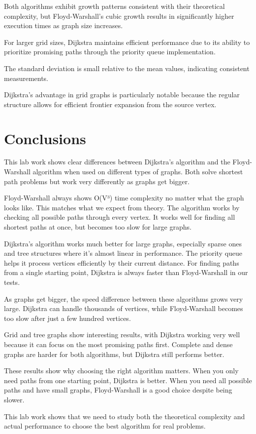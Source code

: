 \documentclass[a4paper,12pt]{article}
\begin{document}
Both algorithms exhibit growth patterns consistent with their theoretical complexity, but Floyd-Warshall's cubic growth results in significantly higher execution times as graph size increases.

For larger grid sizes, Dijkstra maintains efficient performance due to its ability to prioritize promising paths through the priority queue implementation.

The standard deviation is small relative to the mean values, indicating consistent measurements.

Dijkstra's advantage in grid graphs is particularly notable because the regular structure allows for efficient frontier expansion from the source vertex.
\section{Conclusions}
\label{sec:orge143ca6}

This lab work shows clear differences between Dijkstra's algorithm and the Floyd-Warshall algorithm when used on different types of graphs. Both solve shortest path problems but work very differently as graphs get bigger.

Floyd-Warshall always shows O(V³) time complexity no matter what the graph looks like. This matches what we expect from theory. The algorithm works by checking all possible paths through every vertex. It works well for finding all shortest paths at once, but becomes too slow for large graphs.

Dijkstra's algorithm works much better for large graphs, especially sparse ones and tree structures where it's almost linear in performance. The priority queue helps it process vertices efficiently by their current distance. For finding paths from a single starting point, Dijkstra is always faster than Floyd-Warshall in our tests.

As graphs get bigger, the speed difference between these algorithms grows very large. Dijkstra can handle thousands of vertices, while Floyd-Warshall becomes too slow after just a few hundred vertices.

Grid and tree graphs show interesting results, with Dijkstra working very well because it can focus on the most promising paths first. Complete and dense graphs are harder for both algorithms, but Dijkstra still performs better.

These results show why choosing the right algorithm matters. When you only need paths from one starting point, Dijkstra is better. When you need all possible paths and have small graphs, Floyd-Warshall is a good choice despite being slower.

This lab work shows that we need to study both the theoretical complexity and actual performance to choose the best algorithm for real problems.
\end{document}

